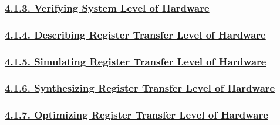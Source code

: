 \documentclass[
]{article}
\begin{document}
\hypertarget{verifying-system-level-of-hardware}{%
\subsubsection{\texorpdfstring{\protect\hyperlink{verifying-system-level-of-hardware-1}{4.1.3.
Verifying System Level of
Hardware}}{4.1.3. Verifying System Level of Hardware}}\label{verifying-system-level-of-hardware}}

\hypertarget{describing-register-transfer-level-of-hardware}{%
\subsubsection{\texorpdfstring{\protect\hyperlink{describing-register-transfer-level-of-hardware-1}{4.1.4.
Describing Register Transfer Level of
Hardware}}{4.1.4. Describing Register Transfer Level of Hardware}}\label{describing-register-transfer-level-of-hardware}}

\hypertarget{simulating-register-transfer-level-of-hardware}{%
\subsubsection{\texorpdfstring{\protect\hyperlink{simulating-register-transfer-level-of-hardware-1}{4.1.5.
Simulating Register Transfer Level of
Hardware}}{4.1.5. Simulating Register Transfer Level of Hardware}}\label{simulating-register-transfer-level-of-hardware}}

\hypertarget{synthesizing-register-transfer-level-of-hardware}{%
\subsubsection{\texorpdfstring{\protect\hyperlink{synthesizing-register-transfer-level-of-hardware-1}{4.1.6.
Synthesizing Register Transfer Level of
Hardware}}{4.1.6. Synthesizing Register Transfer Level of Hardware}}\label{synthesizing-register-transfer-level-of-hardware}}

\hypertarget{optimizing-register-transfer-level-of-hardware}{%
\subsubsection{\texorpdfstring{\protect\hyperlink{optimizing-register-transfer-level-of-hardware-1}{4.1.7.
Optimizing Register Transfer Level of
Hardware}}{4.1.7. Optimizing Register Transfer Level of Hardware}}\label{optimizing-register-transfer-level-of-hardware}}
\end{document}
